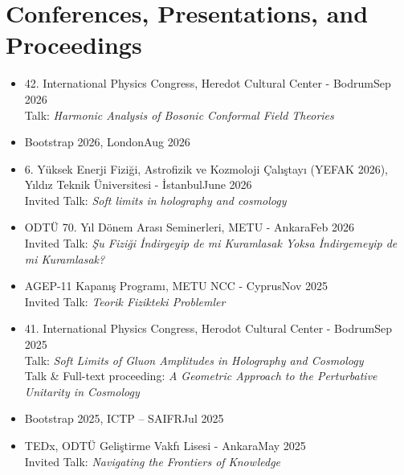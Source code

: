 \documentclass[a4paper,11pt]{article}
\begin{document}
\section{\textcolor{burntorange}{Conferences, Presentations, and Proceedings}}
\begin{itemize}[itemsep=.001em] 
\item[] 42. International Physics Congress, Heredot Cultural Center - Bodrum\hfill Sep 2026
\\
\hspace*{1.8em}Talk: \emph{Harmonic Analysis of Bosonic Conformal Field Theories}

\item[] Bootstrap 2026, London\hfill Aug 2026

\item[] 6. Yüksek Enerji Fiziği, Astrofizik ve Kozmoloji Çalıştayı (YEFAK 2026), Yıldız Teknik Üniversitesi - İstanbul\hfill June 2026
\\
\hspace*{1.8em}Invited Talk: \emph{Soft limits in holography and cosmology}

\item[] ODTÜ 70. Yıl Dönem Arası Seminerleri, METU - Ankara\hfill Feb 2026
\\
\hspace*{1.8em}Invited Talk: \emph{Şu Fiziği İndirgeyip de mi Kuramlasak Yoksa İndirgemeyip de mi Kuramlasak?}

\item[] AGEP-11 Kapanış Programı, METU NCC - Cyprus\hfill Nov 2025
\\
\hspace*{1.8em}Invited Talk: \emph{Teorik Fizikteki Problemler}

\item[] 41. International Physics Congress, Herodot Cultural Center - Bodrum\hfill Sep 2025
\\
\hspace*{1.8em}Talk: \emph{Soft Limits of Gluon Amplitudes in Holography and Cosmology}
\\
\hspace*{1.8em}Talk \& Full-text proceeding: \emph{A Geometric Approach to the Perturbative Unitarity in Cosmology}

\item[] Bootstrap 2025, ICTP – SAIFR\hfill Jul 2025

\item[] TEDx, ODTÜ Geliştirme Vakfı Lisesi - Ankara\hfill May 2025
\\
\hspace*{1.8em}Invited Talk: \emph{Navigating the Frontiers of Knowledge}


\end{itemize}
\end{document}
